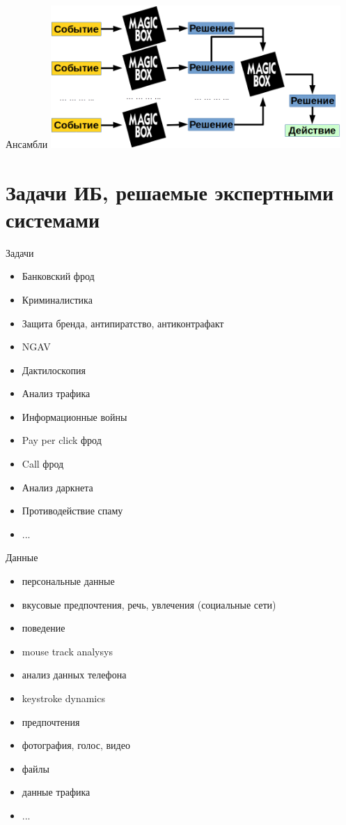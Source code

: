 \documentclass{beamer}
\begin{document}
  \begin{frame}{Ансамбли}
  \includegraphics[width=11cm]{../pic/ensemble_example.png}
  \end{frame}

  \section{Задачи ИБ, решаемые экспертными системами}\label{section:is_tasks}
	
  \begin{frame}{Задачи}
  \begin{itemize}
  	\item Банковский фрод
  	\item Криминалистика
  	\item Защита бренда, антипиратство, антиконтрафакт
  	\item NGAV
  	\item Дактилоскопия
  	\item Анализ трафика
  	\item Информационные войны
  	\item Pay per click фрод
  	\item Call фрод
  	\item Анализ даркнета
  	\item Противодействие спаму
  	\item ...
  \end{itemize} 
  \end{frame}
 
  \begin{frame}{Данные}
  \begin{itemize}
     \item персональные данные
     \item вкусовые предпочтения, речь, увлечения (социальные сети)
     \item поведение
     \item mouse track analysys 
     \item анализ данных телефона
     \item keystroke dynamics
     \item предпочтения
     \item фотография, голос, видео
     \item файлы
     \item данные трафика
     \item ...
  \end{itemize}
  \end{frame}  
\end{document}

